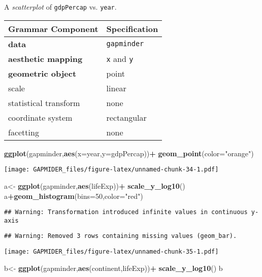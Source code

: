\documentclass[]{article}
\newenvironment{Shaded}{\begin{snugshade}}{\end{snugshade}}
\newcommand{\DataTypeTok}[1]{\textcolor[rgb]{0.13,0.29,0.53}{#1}}
\newcommand{\DecValTok}[1]{\textcolor[rgb]{0.00,0.00,0.81}{#1}}
\newcommand{\KeywordTok}[1]{\textcolor[rgb]{0.13,0.29,0.53}{\textbf{#1}}}
\newcommand{\NormalTok}[1]{#1}
\newcommand{\OperatorTok}[1]{\textcolor[rgb]{0.81,0.36,0.00}{\textbf{#1}}}
\newcommand{\StringTok}[1]{\textcolor[rgb]{0.31,0.60,0.02}{#1}}
\begin{document}
A \emph{scatterplot} of \texttt{gdpPercap} vs. \texttt{year}.

\begin{longtable}[]{@{}ll@{}}
\toprule
Grammar Component & Specification\tabularnewline
\midrule
\endhead
\textbf{data} & \texttt{gapminder}\tabularnewline
\textbf{aesthetic mapping} & \texttt{x} and \texttt{y}\tabularnewline
\textbf{geometric object} & point\tabularnewline
scale & linear\tabularnewline
statistical transform & none\tabularnewline
coordinate system & rectangular\tabularnewline
facetting & none\tabularnewline
\bottomrule
\end{longtable}

\begin{Shaded}
\begin{Highlighting}[]
\KeywordTok{ggplot}\NormalTok{(gapminder,}\KeywordTok{aes}\NormalTok{(}\DataTypeTok{x=}\NormalTok{year,}\DataTypeTok{y=}\NormalTok{gdpPercap))}\OperatorTok{+}
\StringTok{  }\KeywordTok{geom_point}\NormalTok{(}\DataTypeTok{color=}\StringTok{"orange"}\NormalTok{)}
\end{Highlighting}
\end{Shaded}

\texttt{[image: GAPMIDER\_files/figure-latex/unnamed-chunk-34-1.pdf]}

\begin{Shaded}
\begin{Highlighting}[]
\NormalTok{a<-}\StringTok{ }\KeywordTok{ggplot}\NormalTok{(gapminder,}\KeywordTok{aes}\NormalTok{(lifeExp))}\OperatorTok{+}
\StringTok{  }\KeywordTok{scale_y_log10}\NormalTok{()}
\NormalTok{a}\OperatorTok{+}\KeywordTok{geom_histogram}\NormalTok{(}\DataTypeTok{bins=}\DecValTok{50}\NormalTok{,}\DataTypeTok{color=}\StringTok{"red"}\NormalTok{)}
\end{Highlighting}
\end{Shaded}

\begin{verbatim}
## Warning: Transformation introduced infinite values in continuous y-axis
\end{verbatim}

\begin{verbatim}
## Warning: Removed 3 rows containing missing values (geom_bar).
\end{verbatim}

\texttt{[image: GAPMIDER\_files/figure-latex/unnamed-chunk-35-1.pdf]}

\begin{Shaded}
\begin{Highlighting}[]
\NormalTok{b<-}\StringTok{ }\KeywordTok{ggplot}\NormalTok{(gapminder,}\KeywordTok{aes}\NormalTok{(continent,lifeExp))}\OperatorTok{+}
\StringTok{  }\KeywordTok{scale_y_log10}\NormalTok{()}
\NormalTok{b}
\end{Highlighting}
\end{Shaded}
\end{document}
